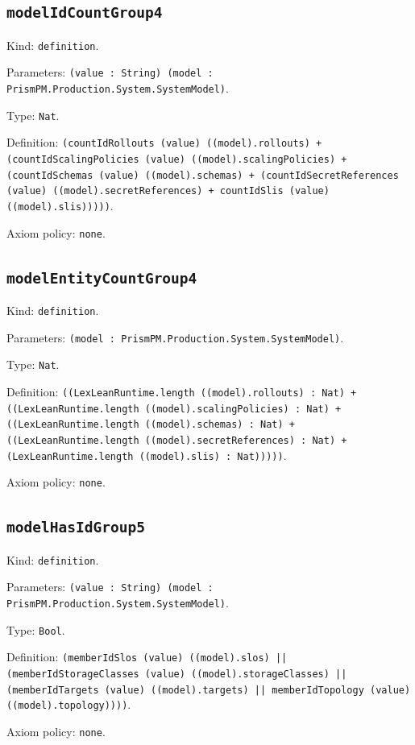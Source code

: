 \documentclass[11pt]{article}
\begin{document}
\subsection*{\texttt{modelIdCountGroup4}}
\noindent Kind: \texttt{definition}.\par
\noindent Parameters: \texttt{(value : String) (model : PrismPM.Production.System.SystemModel)}.\par
\noindent Type: \texttt{Nat}.\par
\noindent Definition: \texttt{(countIdRollouts (value) ((model).rollouts) + (countIdScalingPolicies (value) ((model).scalingPolicies) + (countIdSchemas (value) ((model).schemas) + (countIdSecretReferences (value) ((model).secretReferences) + countIdSlis (value) ((model).slis)))))}.\par
\noindent Axiom policy: \texttt{none}.\par
\subsection*{\texttt{modelEntityCountGroup4}}
\noindent Kind: \texttt{definition}.\par
\noindent Parameters: \texttt{(model : PrismPM.Production.System.SystemModel)}.\par
\noindent Type: \texttt{Nat}.\par
\noindent Definition: \texttt{((LexLeanRuntime.length ((model).rollouts) : Nat) + ((LexLeanRuntime.length ((model).scalingPolicies) : Nat) + ((LexLeanRuntime.length ((model).schemas) : Nat) + ((LexLeanRuntime.length ((model).secretReferences) : Nat) + (LexLeanRuntime.length ((model).slis) : Nat)))))}.\par
\noindent Axiom policy: \texttt{none}.\par
\subsection*{\texttt{modelHasIdGroup5}}
\noindent Kind: \texttt{definition}.\par
\noindent Parameters: \texttt{(value : String) (model : PrismPM.Production.System.SystemModel)}.\par
\noindent Type: \texttt{Bool}.\par
\noindent Definition: \texttt{(memberIdSlos (value) ((model).slos) || (memberIdStorageClasses (value) ((model).storageClasses) || (memberIdTargets (value) ((model).targets) || memberIdTopology (value) ((model).topology))))}.\par
\noindent Axiom policy: \texttt{none}.\par
\end{document}
